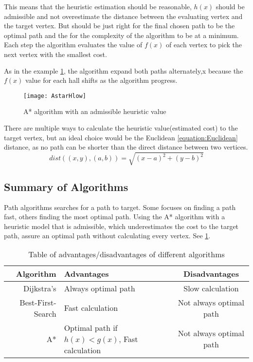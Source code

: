   This means that the heuristic estimation should be reasonable, $h(x)$ should be admissible and not overestimate the distance between the evaluating vertex and the target vertex. But should be just right for the final chosen path to be the optimal path and the for the complexity of the algorithm to be at a minimum. Each step the algorithm evaluates the value of $f(x)$ of each vertex to pick the next vertex with the smallest cost.

  As in the example \cref{astar}, the algorithm expand both paths alternately,x because the $f(x)$ value for each hall shifts as the algorithm progress. 

  \begin{figure}[ht!]
    \centering
    \texttt{[image: AstarHlow]}
    \caption{A* algorithm with an admissible heuristic value}
    \label{astar}
  \end{figure}

  There are multiple ways to calculate the heuristic value(estimated cost) to the target vertex, but an ideal choice would be the Euclidean \cref{equation:Euclidean} distance, as no path can be shorter than the direct distance between two vertices.
  \begin{equation} \label{equation:Euclidean}
    dist((x, y), (a, b)) = \sqrt{(x - a)^2 + (y - b)^2}
  \end{equation}

  \subsection{Summary of Algorithms}

  Path algorithms searches for a path to target. Some focuses on finding a path fast, others finding the most optimal path. Using the A* algorithm with a heuristic model that is admissible, which underestimates the cost to the target path, assure an optimal path without calculating every vertex. See \cref{tbl:scheme}.
  
  \begin{table}[ht!]
    \centering
    \begin{tabular}{|r|l|c|}

      \hline
      \textbf{Algorithm} & \textbf{Advantages} & \textbf{Disadvantages} \\
      \hline
      Dijkstra's & Always optimal path & Slow calculation \\
      Best-First-Search & Fast calculation & Not always optimal path \\
      A* & Optimal path if $h(x)<g(x)$, Fast calculation & Not always optimal path \\
      \hline
    \end{tabular}
    \caption{Table of advantages/disadvantages of different algorithms}
    \label{tbl:scheme}
  \end{table}